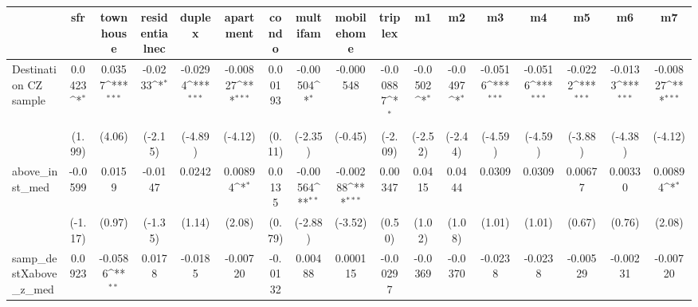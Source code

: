 \begin{table}[htbp]\centering
\def\sym#1{\ifmmode^{#1}\else\(^{#1}\)\fi}
\caption{ \label{tab1}}
\begin{tabular}{l*{16}{c}}
\toprule
                    &\multicolumn{1}{c}{sfr}&\multicolumn{1}{c}{townhouse}&\multicolumn{1}{c}{residentialnec}&\multicolumn{1}{c}{duplex}&\multicolumn{1}{c}{apartment}&\multicolumn{1}{c}{condo}&\multicolumn{1}{c}{multifam}&\multicolumn{1}{c}{mobilehome}&\multicolumn{1}{c}{triplex}&\multicolumn{1}{c}{m1}&\multicolumn{1}{c}{m2}&\multicolumn{1}{c}{m3}&\multicolumn{1}{c}{m4}&\multicolumn{1}{c}{m5}&\multicolumn{1}{c}{m6}&\multicolumn{1}{c}{m7}\\
\midrule
Destination CZ sample&      0.0423\sym{*}  &      0.0357\sym{***}&     -0.0233\sym{*}  &     -0.0294\sym{***}&    -0.00827\sym{***}&     0.00193         &    -0.00504\sym{*}  &   -0.000548         &    -0.00887\sym{*}  &     -0.0502\sym{*}  &     -0.0497\sym{*}  &     -0.0516\sym{***}&     -0.0516\sym{***}&     -0.0222\sym{***}&     -0.0133\sym{***}&    -0.00827\sym{***}\\
                    &      (1.99)         &      (4.06)         &     (-2.15)         &     (-4.89)         &     (-4.12)         &      (0.11)         &     (-2.35)         &     (-0.45)         &     (-2.09)         &     (-2.52)         &     (-2.44)         &     (-4.59)         &     (-4.59)         &     (-3.88)         &     (-4.38)         &     (-4.12)         \\
\addlinespace
above\_inst\_med      &     -0.0599         &      0.0159         &     -0.0147         &      0.0242         &     0.00894\sym{*}  &      0.0135         &    -0.00564\sym{**} &    -0.00288\sym{***}&     0.00347         &      0.0415         &      0.0444         &      0.0309         &      0.0309         &     0.00677         &     0.00330         &     0.00894\sym{*}  \\
                    &     (-1.17)         &      (0.97)         &     (-1.35)         &      (1.14)         &      (2.08)         &      (0.79)         &     (-2.88)         &     (-3.52)         &      (0.50)         &      (1.02)         &      (1.08)         &      (1.01)         &      (1.01)         &      (0.67)         &      (0.76)         &      (2.08)         \\
\addlinespace
samp\_destXabove\_z\_med&      0.0923         &     -0.0586\sym{**} &      0.0178         &     -0.0185         &    -0.00720         &     -0.0132         &     0.00488         &    0.000115         &    -0.00297         &     -0.0369         &     -0.0370         &     -0.0238         &     -0.0238         &    -0.00529         &    -0.00231         &    -0.00720         \\

\end{tabular}
\end{table}
